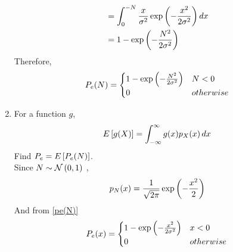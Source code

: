 \begin{enumerate}
\begin{align}
 &=\int_{0}^{-N} \frac{x}{\sigma^2}\exp\left({-\frac{x^2}{2\sigma^2}}\right)dx\\
 &=1-\exp{\ensuremath{\left(-\frac{N^2}{2\sigma^2}\right)}}
\end{align}
Therefore,
\begin{align}\label{pe(N)}
P_e(N) = 
\begin{cases}
1-\exp\left({-\frac{N^2}{2\sigma^2}}\right) & N<0\\
0 & otherwise
\end{cases}
\end{align}
%
\item
%
\label{ch4_anal}
For a function $g$,
\begin{equation}
E{}\left[g(X)\right] = \int_{-\infty}^{\infty}g(x)p_{X}(x)\, dx
\end{equation}
%
Find $P_e = E{}\left[P_e(N)\right]$.\\
\solution Since $N \sim \mathcal{N}\left(0,1\right)$ ,
\begin{align}
  p_N(x)= \frac{1}{\sqrt{2\pi}}\exp \left(-\frac{x^2}{2} \right)
\end{align}
And from \eqref{pe(N)} 
\begin{align}
    P_e(x)=
    \begin{cases}
1-\exp\left({-\frac{x^2}{2\sigma^2}}\right) & x<0\\
0 & otherwise
\end{cases}
\end{align}


\end{enumerate}
